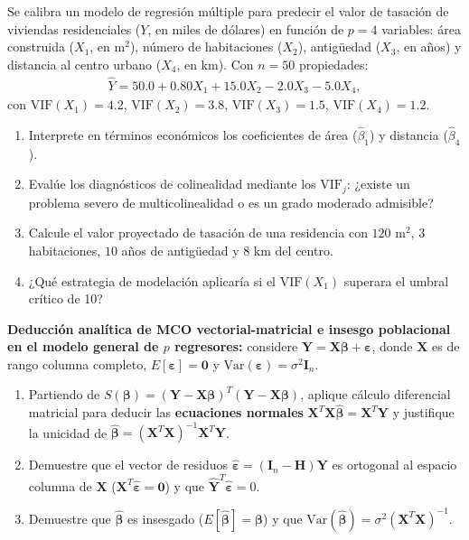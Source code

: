 \begin{problema}
	\label{prob:1d085e7}
	Se calibra un modelo de regresión múltiple para predecir el valor de tasación de viviendas residenciales ($Y$, en miles de dólares) en función de $p = 4$ variables: área construida ($X_1$, en m$^2$), número de habitaciones ($X_2$), antigüedad ($X_3$, en años) y distancia al centro urbano ($X_4$, en km). Con $n = 50$ propiedades:
	\begin{align}
		\hat{Y} = 50.0 + 0.80X_1 + 15.0X_2 - 2.0X_3 - 5.0X_4,
	\end{align}
	con $\text{VIF}(X_1) = 4.2$, $\text{VIF}(X_2) = 3.8$, $\text{VIF}(X_3) = 1.5$, $\text{VIF}(X_4) = 1.2$.
	\begin{enumerate}
		\item Interprete en términos económicos los coeficientes de área ($\hat{\beta}_1$) y distancia ($\hat{\beta}_4$).
		\item Evalúe los diagnósticos de colinealidad mediante los $\text{VIF}_j$: ¿existe un problema severo de multicolinealidad o es un grado moderado admisible?
		\item Calcule el valor proyectado de tasación de una residencia con $120$ m$^2$, $3$ habitaciones, $10$ años de antigüedad y $8$ km del centro.
		\item ¿Qué estrategia de modelación aplicaría si el $\text{VIF}(X_1)$ superara el umbral crítico de 10?
	\end{enumerate}
\end{problema}

\begin{problema}
	\label{prob:15ced94}
	\textbf{Deducción analítica de MCO vectorial-matricial e insesgo poblacional en el modelo general de $p$ regresores:} considere $\mathbf{Y} = \mathbf{X}\boldsymbol{\beta} + \boldsymbol{\varepsilon}$, donde $\mathbf{X}$ es de rango columna completo, $E[\boldsymbol{\varepsilon}] = \mathbf{0}$ y $\text{Var}(\boldsymbol{\varepsilon}) = \sigma^2\mathbf{I}_n$.
	\begin{enumerate}
		\item Partiendo de $S(\boldsymbol{\beta}) = (\mathbf{Y}-\mathbf{X}\boldsymbol{\beta})^T(\mathbf{Y}-\mathbf{X}\boldsymbol{\beta})$, aplique cálculo diferencial matricial para deducir las \textbf{ecuaciones normales} $\mathbf{X}^T\mathbf{X}\hat{\boldsymbol{\beta}} = \mathbf{X}^T\mathbf{Y}$ y justifique la unicidad de $\hat{\boldsymbol{\beta}} = (\mathbf{X}^T\mathbf{X})^{-1}\mathbf{X}^T\mathbf{Y}$.
		\item Demuestre que el vector de residuos $\hat{\boldsymbol{\varepsilon}} = (\mathbf{I}_n-\mathbf{H})\mathbf{Y}$ es ortogonal al espacio columna de $\mathbf{X}$ ($\mathbf{X}^T\hat{\boldsymbol{\varepsilon}}=\mathbf{0}$) y que $\hat{\mathbf{Y}}^T\hat{\boldsymbol{\varepsilon}}=0$.
		\item Demuestre que $\hat{\boldsymbol{\beta}}$ es insesgado ($E[\hat{\boldsymbol{\beta}}]=\boldsymbol{\beta}$) y que $\text{Var}(\hat{\boldsymbol{\beta}}) = \sigma^2(\mathbf{X}^T\mathbf{X})^{-1}$.
	\end{enumerate}
\end{problema}

